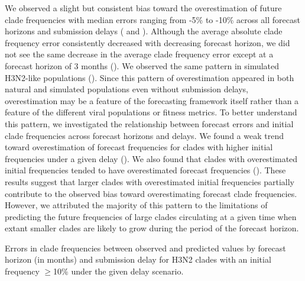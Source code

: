 \documentclass[9pt,lineno]{elife}
\begin{document}
We observed a slight but consistent bias toward the overestimation of future clade frequencies with median errors ranging from -5\% to -10\% across all forecast horizons and submission delays ( and ).
Although the average absolute clade frequency error consistently decreased with decreasing forecast horizon, we did not see the same decrease in the average clade frequency error except at a forecast horizon of 3 months ().
We observed the same pattern in simulated H3N2-like populations ().
Since this pattern of overestimation appeared in both natural and simulated populations even without submission delays, overestimation may be a feature of the forecasting framework itself rather than a feature of the different viral populations or fitness metrics.
To better understand this pattern, we investigated the relationship between forecast errors and initial clade frequencies across forecast horizons and delays.
We found a weak trend toward overestimation of forecast frequencies for clades with higher initial frequencies under a given delay ().
We also found that clades with overestimated initial frequencies tended to have overestimated forecast frequencies ().
These results suggest that larger clades with overestimated initial frequencies partially contribute to the observed bias toward overestimating forecast clade frequencies.
However, we attributed the majority of this pattern to the limitations of predicting the future frequencies of large clades circulating at a given time when extant smaller clades are likely to grow during the period of the forecast horizon.

\begin{table}[htb]
  \begin{center}
    
    \caption{Errors in clade frequencies between observed and predicted values by forecast horizon (in months) and submission delay for H3N2 clades with an initial frequency $\geq$10\% under the given delay scenario.}
    \label{tab:h3n2_forecast_clade_frequency_errors}
  \end{center}
\end{table}
\end{document}
